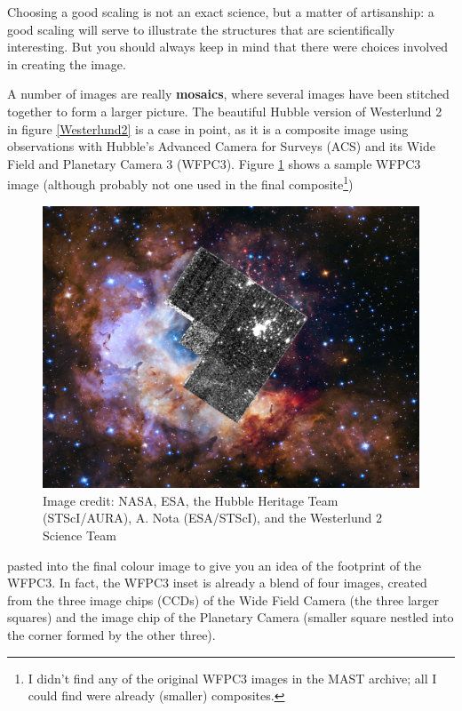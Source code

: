 \documentclass[twocolumn,apj]{openjournal}
\begin{document}
Choosing a good scaling is not an exact science, but a matter of artisanship: a good scaling will serve to illustrate the structures that are scientifically interesting. But you should always keep in mind that there were choices involved in creating the image. 

A number of images are really {\bf mosaics}, where several images have been stitched together to form a larger picture. The beautiful Hubble version of Westerlund 2 in figure \ref{Westerlund2} is a case in point, as it is a composite image using observations with Hubble's Advanced Camera for Surveys (ACS) and its Wide Field and Planetary Camera 3 (WFPC3). Figure \ref{WesterlundInset} shows
a sample WFPC3 image (although 
probably not one used in the final composite\footnote{
I didn't find any of the original WFPC3 images in the MAST archive; all I could find were already (smaller) composites.}) \begin{figure}[htbp]
\begin{center}
\includegraphics[width=\linewidth]{westerlund2-inset.jpg}
\caption{Image credit: NASA, ESA, the Hubble Heritage Team (STScI/AURA), A. Nota (ESA/STScI), and the Westerlund 2 Science Team}
\label{WesterlundInset}
\end{center}
\end{figure}
pasted into the final colour image to give you an idea of the footprint of the WFPC3. In fact, the WFPC3 inset is already a blend of four images, created from the three image chips (CCDs) of the Wide Field Camera (the three larger squares) and the image chip of the Planetary Camera (smaller square nestled into the corner formed by the other three).
\end{document}
